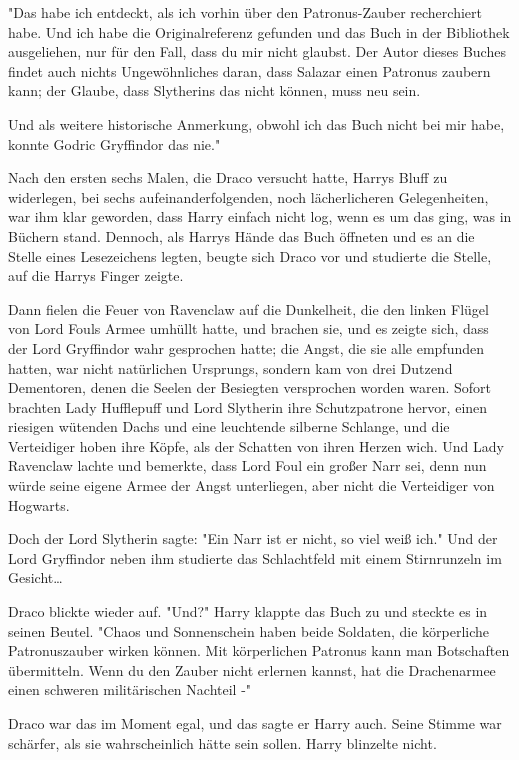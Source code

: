 {"Das habe ich entdeckt, als ich vorhin über den Patronus-Zauber recherchiert habe. Und ich habe die Originalreferenz gefunden und das Buch in der Bibliothek ausgeliehen, nur für den Fall, dass du mir nicht glaubst. Der Autor dieses Buches findet auch nichts Ungewöhnliches daran, dass Salazar einen Patronus zaubern kann; der Glaube, dass Slytherins das nicht können, muss neu sein.

Und als weitere historische Anmerkung, obwohl ich das Buch nicht bei mir habe, konnte Godric Gryffindor das nie."

Nach den ersten sechs Malen, die Draco versucht hatte, Harrys Bluff zu widerlegen, bei sechs aufeinanderfolgenden, noch lächerlicheren Gelegenheiten, war ihm klar geworden, dass Harry einfach nicht log, wenn es um das ging, was in Büchern stand. Dennoch, als Harrys Hände das Buch öffneten und es an die Stelle eines Lesezeichens legten, beugte sich Draco vor und studierte die Stelle, auf die Harrys Finger zeigte.

Dann fielen die Feuer von Ravenclaw auf die Dunkelheit, die den linken Flügel von Lord Fouls Armee umhüllt hatte, und brachen sie, und es zeigte sich, dass der Lord Gryffindor wahr gesprochen hatte; die Angst, die sie alle empfunden hatten, war nicht natürlichen Ursprungs, sondern kam von drei Dutzend Dementoren, denen die Seelen der Besiegten versprochen worden waren. Sofort brachten Lady Hufflepuff und Lord Slytherin ihre Schutzpatrone hervor, einen riesigen wütenden Dachs und eine leuchtende silberne Schlange, und die Verteidiger hoben ihre Köpfe, als der Schatten von ihren Herzen wich. Und Lady Ravenclaw lachte und bemerkte, dass Lord Foul ein großer Narr sei, denn nun würde seine eigene Armee der Angst unterliegen, aber nicht die Verteidiger von Hogwarts.

Doch der Lord Slytherin sagte: "Ein Narr ist er nicht, so viel weiß ich." Und der Lord Gryffindor neben ihm studierte das Schlachtfeld mit einem Stirnrunzeln im Gesicht…

Draco blickte wieder auf. "Und?" Harry klappte das Buch zu und steckte es in seinen Beutel. "Chaos und Sonnenschein haben beide Soldaten, die körperliche Patronuszauber wirken können. Mit körperlichen Patronus kann man Botschaften übermitteln. Wenn du den Zauber nicht erlernen kannst, hat die Drachenarmee einen schweren militärischen Nachteil -"

Draco war das im Moment egal, und das sagte er Harry auch. Seine Stimme war schärfer, als sie wahrscheinlich hätte sein sollen. Harry blinzelte nicht.

}
